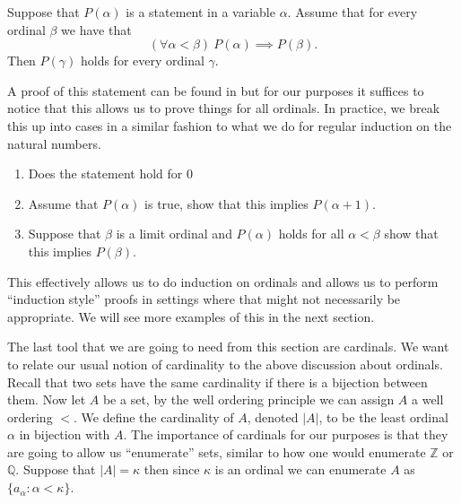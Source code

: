 \begin{thm}
  Suppose that $P(\alpha)$ is a statement in a variable $\alpha$. Assume that
  for every ordinal $\beta$ we have that
   \[
     (\forall \alpha < \beta)\  P(\alpha) \implies P(\beta)
  .\] 
  Then $P(\gamma)$ holds for every ordinal $\gamma$.
\end{thm}

A proof of this statement can be found in \cite{Schimmerling2011-li} but for our
purposes it suffices to notice that this allows us to prove things for all
ordinals. In practice, we break this up into cases in a similar fashion to what
we do for regular induction on the natural numbers.

\begin{enumerate}
  \item Does the statement hold for $0$
  \item Assume that $P(\alpha)$ is true, show that this implies  $P(\alpha + 1)$.
  \item Suppose that $\beta$ is a limit ordinal and $P(\alpha)$ holds for all
    $\alpha < \beta$ show that this implies $P(\beta)$.
\end{enumerate}

This effectively allows us to do induction on ordinals and allows us to perform
``induction style'' proofs in settings where that might not necessarily be
appropriate. We will see more examples of this in the next section.

The last tool that we are going to need from this section are cardinals. We
want to relate our usual notion of cardinality to the above discussion about
ordinals. Recall that two sets have the same cardinality if there is
a bijection between them. Now let $A$ be a set, by the well ordering principle
we can assign $A$ a well ordering $<$. We define the cardinality of $A$,
denoted $|A|$, to be the least ordinal $\alpha$ in bijection with $A$. The
importance of cardinals for our purposes is that they are going to allow us
``enumerate'' sets, similar to how one would enumerate $\mathbb{Z}$ or
$\mathbb{Q}$. Suppose that $|A| = \kappa$ then since $\kappa$ is an ordinal we
can enumerate $A$ as $\{a_{\alpha}: \alpha < \kappa\}$.

